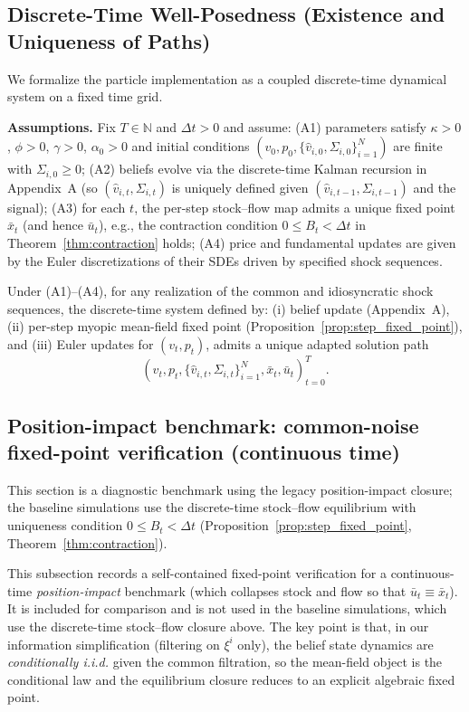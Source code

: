 \subsection{Discrete-Time Well-Posedness (Existence and Uniqueness of Paths)}

We formalize the particle implementation as a coupled discrete-time dynamical system on a fixed time grid.

\textbf{Assumptions.}
Fix $T\in\mathbb N$ and $\Delta t>0$ and assume:
(A1) parameters satisfy $\kappa>0$, $\phi>0$, $\gamma>0$, $\alpha_0>0$ and initial conditions $(v_0,p_0,\{\hat v_{i,0},\Sigma_{i,0}\}_{i=1}^N)$ are finite with $\Sigma_{i,0}\ge 0$;
(A2) beliefs evolve via the discrete-time Kalman recursion in Appendix~A (so $(\hat v_{i,t},\Sigma_{i,t})$ is uniquely defined given $(\hat v_{i,t-1},\Sigma_{i,t-1})$ and the signal);
(A3) for each $t$, the per-step stock--flow map admits a unique fixed point $\bar x_t$ (and hence $\bar u_t$), e.g., the contraction condition $0\le B_t<\Delta t$ in Theorem~\ref{thm:contraction} holds;
(A4) price and fundamental updates are given by the Euler discretizations of their SDEs driven by specified shock sequences.

\begin{theorem}
\label{thm:well_posed}
Under (A1)--(A4), for any realization of the common and idiosyncratic shock sequences, the discrete-time system defined by: (i) belief update (Appendix~A), (ii) per-step myopic mean-field fixed point (Proposition~\ref{prop:step_fixed_point}), and (iii) Euler updates for $(v_t,p_t)$, admits a unique adapted solution path
\[
(v_t,p_t,\{\hat v_{i,t},\Sigma_{i,t}\}_{i=1}^N,\bar x_t,\bar u_t)_{t=0}^T.
\]
\end{theorem}

\subsection{Position-impact benchmark: common-noise fixed-point verification (continuous time)}\label{sec:cn_fp_verification}

This section is a diagnostic benchmark using the legacy position-impact closure; the baseline simulations use the discrete-time stock--flow equilibrium with uniqueness condition $0\le B_t<\Delta t$ (Proposition~\ref{prop:step_fixed_point}, Theorem~\ref{thm:contraction}).

This subsection records a self-contained fixed-point verification for a continuous-time \emph{position-impact} benchmark (which collapses stock and flow so that $\bar u_t\equiv \bar x_t$).
It is included for comparison and is not used in the baseline simulations, which use the discrete-time stock--flow closure above.
The key point is that, in our information simplification (filtering on $\xi^i$ only),
the belief state dynamics are \emph{conditionally i.i.d.} given the common filtration, so the mean-field
object is the conditional law and the equilibrium closure reduces to an explicit algebraic fixed point.

